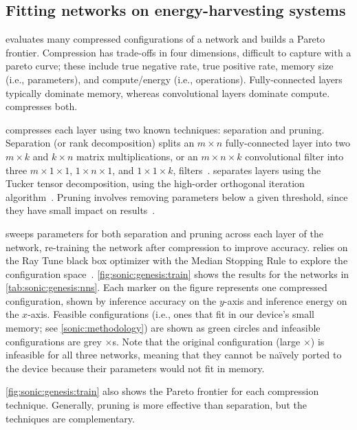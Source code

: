 \figSONICGenesisNNs
\subsection{Fitting networks on energy-harvesting systems}

\genesis evaluates many compressed configurations of a 
network and builds a Pareto frontier.
%
Compression has trade-offs in four dimensions, difficult to capture with a pareto curve;
these include true negative rate, true positive rate, memory size (i.e.,
parameters), and compute/energy (i.e., operations).
%
Fully-connected layers typically dominate memory, whereas convolutional layers
dominate compute. \genesis compresses both.

\genesis compresses each layer using two known techniques: separation and pruning.
%
Separation (or rank decomposition) splits an $m \times n$
fully-connected layer into two $m \times k$ and $k \times n$ matrix
multiplications, or an $m \times n \times k$ convolutional filter into three $m
\times 1 \times 1$, $1 \times n \times 1$, and $1 \times 1 \times k$, 
filters~\cite{chollet2016xception, bhattacharya2016sparsification}.
%
\genesis separates layers using the Tucker tensor decomposition,
using the high-order orthogonal iteration algorithm~\cite{tucker1966some, de2000best, de2000multilinear}.
%
Pruning involves removing parameters below a given threshold, since
they have small impact on results~\cite{nabhan1994toward, han:iclr16:deep-compression}.

\genesis sweeps parameters for both separation and pruning across each layer of
the network, re-training the network after compression to improve
accuracy.
%
\genesis relies on the Ray Tune black box optimizer with the Median
Stopping Rule to explore the configuration space~\cite{golovin2017google, moritz2017ray}.
%
\autoref{fig:sonic:genesis:train} shows the results for the networks in
\autoref{tab:sonic:genesis:nns}.
%
Each marker on the figure represents one compressed configuration,
shown by inference accuracy on the $y$-axis and inference energy on
the $x$-axis.
%
Feasible configurations (i.e., ones that fit in our device's 
small memory; see \autoref{sonic:methodology}) are shown as green
circles and infeasible configurations are grey $\times$s.
%
Note that the original configuration (large $\times$) is infeasible for all three networks,
meaning that they cannot be na\"ively ported to the device because their parameters would not fit in memory.

\autoref{fig:sonic:genesis:train} also shows the Pareto frontier for each
compression technique.
%
Generally, pruning is more effective than separation, but the
techniques are complementary.

